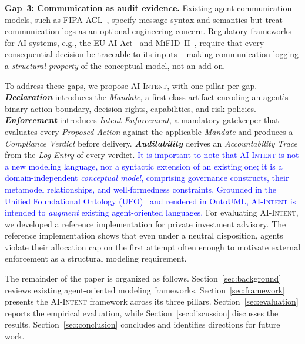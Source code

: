 \documentclass[runningheads]{llncs}
\begin{document}
\textbf{Gap~3: Communication as audit evidence.} Existing agent communication models, such as FIPA-ACL~\cite{fipa2002}, specify message syntax and semantics but treat communication logs as an optional engineering concern. Regulatory frameworks for AI systems, e.g., the EU AI Act~\cite{euaiact2024} and MiFID~II~\cite{mifid2014}, require that every consequential decision be traceable to its inputs -- making communication logging a \emph{structural property} of the conceptual model, not an add-on.

To address these gaps, we propose \textsc{AI-Intent}, with one pillar per gap. \textbf{\textit{Declaration}} introduces the \textit{Mandate}, a first-class artifact encoding an agent's binary action boundary, decision rights, capabilities, and risk policies. \textbf{\textit{Enforcement}} introduces \textit{Intent Enforcement}, a mandatory gatekeeper that evaluates every \textit{Proposed Action} against the applicable \textit{Mandate} and produces a \textit{Compliance Verdict} before delivery. \textbf{\textit{Auditability}} derives an \textit{Accountability Trace} from the \textit{Log Entry} of every verdict. \textcolor{blue}{It is important to note that \textsc{AI-Intent} is not a new modeling language, nor a syntactic extension of an existing one; it is a domain-independent \emph{conceptual model}, comprising governance constructs, their metamodel relationships, and well-formedness constraints.
Grounded in the Unified Foundational Ontology (UFO)~\cite{guizzardi2005ontological} and rendered in OntoUML, \textsc{AI-Intent} is intended to \textit{augment} existing agent-oriented languages. }
For evaluating \textsc{AI-Intent}, we developed a reference implementation for private investment advisory. The reference implementation shows that even under a neutral disposition, agents violate their allocation cap on the first attempt often enough to motivate external enforcement as a structural modeling requirement.

The remainder of the paper is organized as follows. Section~\ref{sec:background}
reviews existing agent-oriented modeling frameworks. Section~\ref{sec:framework}
presents the \textsc{AI-Intent} framework across its three pillars. Section~\ref{sec:evaluation}
reports the empirical evaluation, while Section~\ref{sec:discussion}
discusses the results. Section~\ref{sec:conclusion} concludes and
identifies directions for future work.
\end{document}
